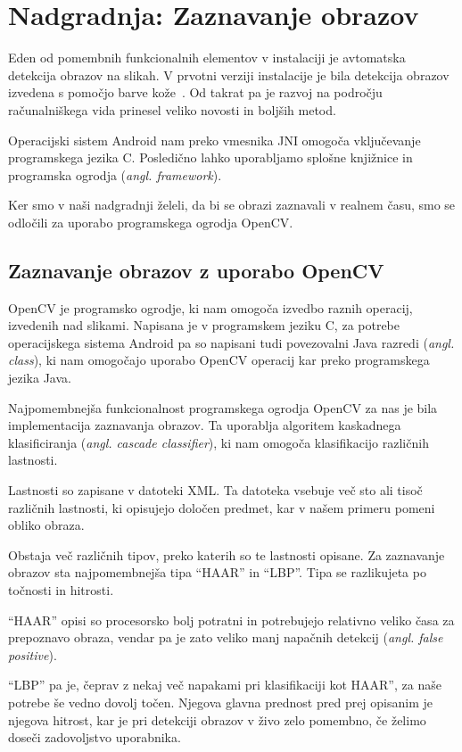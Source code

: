 \chapter{Nadgradnja: Zaznavanje obrazov}
\label{ch:zaznavanjeObrazov}
Eden od pomembnih funkcionalnih elementov v instalaciji je avtomatska detekcija  obrazov na slikah. V prvotni verziji instalacije je bila detekcija obrazov izvedena s pomočjo barve kože~\cite{mirage03}. Od takrat pa je razvoj na področju računalniškega vida prinesel veliko novosti in boljših metod.

Operacijski sistem Android nam preko vmesnika JNI omogoča vključevanje
programskega jezika C. Posledično lahko uporabljamo splošne knjižnice in
programska ogrodja (\textit{angl. framework}).

Ker smo v naši nadgradnji želeli, da bi se obrazi zaznavali v realnem času,
smo se odločili za uporabo programskega ogrodja OpenCV.


\section{Zaznavanje obrazov z uporabo OpenCV}
\label{sec:zaznavanjeObrazovOpenCV}
OpenCV je programsko ogrodje, ki nam omogoča izvedbo raznih operacij,
izvedenih nad slikami. Napisana je v programskem jeziku C, za potrebe
operacijskega sistema Android pa so napisani tudi povezovalni Java razredi
(\textit{angl. class}), ki nam omogočajo uporabo OpenCV operacij kar preko
programskega jezika Java.

Najpomembnejša funkcionalnost programskega ogrodja OpenCV za nas je bila
implementacija zaznavanja obrazov. Ta uporablja algoritem kaskadnega
klasificiranja (\textit{angl. cascade classifier}), ki nam omogoča
klasifikacijo različnih lastnosti.

Lastnosti so zapisane v datoteki XML. Ta datoteka vsebuje več sto ali tisoč
različnih lastnosti, ki opisujejo določen predmet, kar v našem primeru pomeni
obliko obraza.

Obstaja več različnih tipov, preko katerih so te lastnosti opisane. Za
zaznavanje obrazov sta najpomembnejša tipa ``HAAR'' in ``LBP''. Tipa se
razlikujeta po točnosti in hitrosti.

``HAAR'' opisi so procesorsko bolj potratni in potrebujejo relativno veliko
časa za prepoznavo obraza, vendar pa je zato veliko manj napačnih detekcij
(\textit{angl. false positive}).

``LBP'' pa je, čeprav z nekaj več napakami pri klasifikaciji kot HAAR'', za
naše potrebe še vedno dovolj točen. Njegova glavna prednost pred prej
opisanim je  njegova hitrost, kar je pri detekciji obrazov v živo zelo
pomembno, če želimo doseči zadovoljstvo uporabnika.

